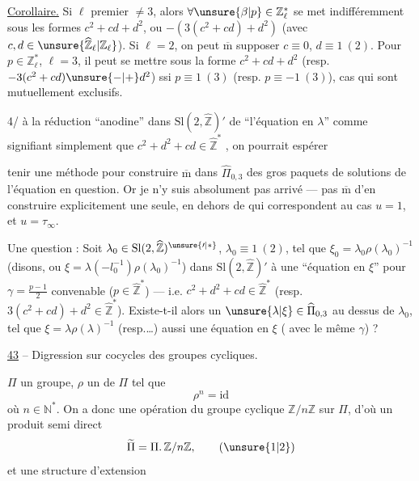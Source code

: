 \uline{Corollaire.}  Si $\ell$  premier $\ne3$, alors $\forall\unsure{\beta|p}\in\mathbb Z_\ell^{*}$ se met indifféremment sous les formes $c^2+cd+d^2$, ou $-(3(c^2+cd)+d^2)$ (avec $c,d\in\unsure{\widehat{\mathbb Z}_\ell|\mathbb Z_\ell}$). Si $\ell=2$, on peut $\overline{\mathrm m}$ supposer $c\equiv0$, $d\equiv1\ (2)$. Pour $p\in\mathbb Z_\ell^{*}$, $\ell=3$, il peut se mettre sous la forme $c^2+cd+d^2$ (resp. $-3(c^2+cd)\unsure{-|+}d^2$) ssi $p\equiv1\ (3)$ (resp. $p\equiv-1\ (3)$), cas qui sont mutuellement exclusifs.

4/  à la réduction ``anodine'' dans $\mathrm{Sl}(2,\widehat{\mathbb Z})'$ de ``l'équation en $\lambda$'' comme signifiant simplement que $c^2+d^2+cd\in\widehat{\mathbb Z}^{*}$ , on pourrait espérer


tenir une méthode pour construire $\overline{\mathrm m}$ dans $\widehat{\Pi}_{0,3}$ des gros paquets de solutions de l'équation en question. Or je n'y suis absolument pas arrivé --- pas $\overline{\mathrm m}$ d'en construire explicitement une seule, en dehors de  qui correspondent au cas $u=1$, et $u=\tau_\infty$.

Une question : Soit $\lambda_0\in\mathrm{Sl}(2,\widehat{\mathbb Z})^{\unsure{\prime|*}}$, $\lambda_0\equiv1\ (2)$, tel que $\xi_0=\lambda_0\rho(\lambda_0)^{-1}$ (disons, ou $\xi=\lambda(-l_0^{-1})\rho(\lambda_0)^{-1}$)   dans $\mathrm{Sl}(2,\widehat{\mathbb Z})'$ à une ``équation en $\xi$'' pour $\gamma=\frac{p-1}{2}$ convenable ($p\in\widehat{\mathbb Z}^{*}$) --- i.e. $c^2+d^2+cd\in\widehat{\mathbb Z}^{*}$ (resp. $3(c^2+cd)+d^2\in\widehat{\mathbb Z}^{*}$). Existe-t-il alors un $\unsure{\lambda|\xi}\in\widehat{\Pi}_{0,3}$ au dessus de $\lambda_0$, tel que $\xi=\lambda\rho(\lambda)^{-1}$ (resp.\ldots)  aussi une équation en $\xi$ ( avec le même $\gamma$) ?


\uline{43}  -- Digression sur cocycles des groupes cycliques.

 $\Pi$ un groupe, $\rho$ un  de $\Pi$ tel que
\[
\rho^n=\mathrm{id} \tag{1}
\]
où $n\in\mathbb N^*$. On a donc une opération du groupe cyclique $\mathbb Z/n\mathbb Z$ sur $\Pi$, d'où un produit semi direct
\[
\widetilde\Pi=\Pi.\,\mathbb Z/n\mathbb Z, \tag{\unsure{1|2}}
\]
et une structure d'extension

